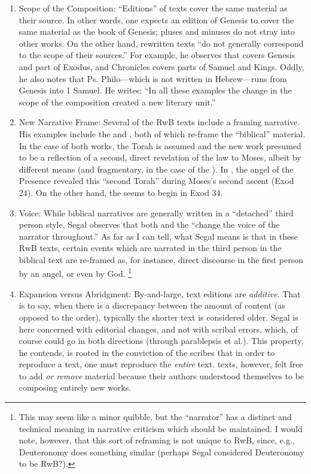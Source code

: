 \begin{enumerate}
    \item Scope of the Composition: ``Editions'' of texts cover the same material as their source. In other words, one expects an edition of Genesis to cover the same material as the book of Genesis; pluses and minuses do not stray into other works. On the other hand, rewritten texts ``do not generally correspond to the scope of their sources.''%
        \autocite[20]{segal_henze2005}
    For example, he observes that \jub covers Genesis and part of Exodus, and Chronicles covers parts of Samuel and Kings. Oddly, he also notes that Ps. Philo---which is not written in Hebrew---runs from Genesis into 1 Samuel. He writes: ``In all these examples the change in the scope of the composition created a new literary unit.''%
        \autocite[20--21]{segal_henze2005}
  
    \item New Narrative Frame: Several of the RwB texts include a framing narrative. His examples include the \templescroll and \jub, both of which re-frame the ``biblical'' material. In the case of both works, the Torah is assumed and the new work presumed to be a reflection of a second, direct revelation of the law to Moses, albeit by different means (and fragmentary, in the case of the \templescroll). In \jub, the angel of the Presence revealed this ``second Torah'' during Moses's second ascent (Exod 24). On the other hand, the \templescroll seems to begin in Exod 34.%
        \autocite[22]{segal_henze2005}
   
    \item Voice: While biblical narratives are generally written in a ``detached'' third person style, Segal observes that both \jub and the \templescroll ``change the voice of the narrator throughout.''%
        \autocite[22]{segal_henze2005}
    As far as I can tell, what Segal means is that in these RwB texts, certain events which are narrated in the third person in the biblical text are re-framed as, for instance, direct discourse in the first person by an angel, or even by God.%
        \footnote{This may seem like a minor quibble, but the ``narrator'' has a distinct and technical meaning in narrative criticism which should be maintained. I would note, however, that this sort of reframing is not unique to RwB, since, e.g., Deuteronomy does something similar (perhaps Segal considered Deuteronomy to be RwB?).}
 
    \item Expansion versus Abridgment: By-and-large, text editions are \emph{additive}. That is to say, when there is a discrepancy between the amount of content (as opposed to the order), typically the shorter text is considered older. Segal is here concerned with editorial changes, and not with scribal errors, which, of course could go in both directions (through parablepsis et al.). This property, he contends, is rooted in the conviction of the scribes that in order to reproduce a text, one must reproduce the \emph{entire} text.%
        \autocite[24]{segal_henze2005}
    \rwb texts, however, felt free to add \emph{or remove} material because their authors understood themselves to be composing entirely new works.%
        \autocite[24]{segal_henze2005} 


\end{enumerate}
